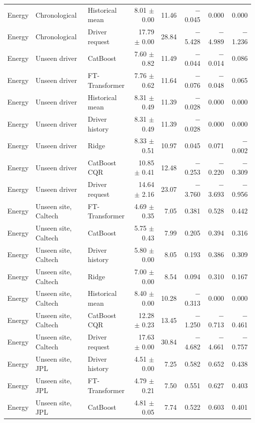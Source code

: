 {\begin{longtable}{lllrrrrr}
Energy & Chronological & Historical mean & 8.01 $\pm$ 0.00 & 11.46 & $-$0.045 & 0.000 & 0.000 \\
Energy & Chronological & Driver request & 17.79 $\pm$ 0.00 & 28.84 & $-$5.428 & $-$4.989 & $-$1.236 \\
Energy & Unseen driver & CatBoost & 7.60 $\pm$ 0.82 & 11.49 & $-$0.044 & $-$0.014 & 0.086 \\
Energy & Unseen driver & FT-Transformer & 7.76 $\pm$ 0.62 & 11.64 & $-$0.076 & $-$0.048 & 0.065 \\
Energy & Unseen driver & Historical mean & 8.31 $\pm$ 0.49 & 11.39 & $-$0.028 & 0.000 & 0.000 \\
Energy & Unseen driver & Driver history & 8.31 $\pm$ 0.49 & 11.39 & $-$0.028 & 0.000 & 0.000 \\
Energy & Unseen driver & Ridge & 8.33 $\pm$ 0.51 & 10.97 & 0.045 & 0.071 & $-$0.002 \\
Energy & Unseen driver & CatBoost CQR & 10.85 $\pm$ 0.41 & 12.48 & $-$0.253 & $-$0.220 & $-$0.309 \\
Energy & Unseen driver & Driver request & 14.64 $\pm$ 2.16 & 23.07 & $-$3.760 & $-$3.693 & $-$0.956 \\
Energy & Unseen site, Caltech & FT-Transformer & 4.69 $\pm$ 0.35 & 7.05 & 0.381 & 0.528 & 0.442 \\
Energy & Unseen site, Caltech & CatBoost & 5.75 $\pm$ 0.43 & 7.99 & 0.205 & 0.394 & 0.316 \\
Energy & Unseen site, Caltech & Driver history & 5.80 $\pm$ 0.00 & 8.05 & 0.193 & 0.386 & 0.309 \\
Energy & Unseen site, Caltech & Ridge & 7.00 $\pm$ 0.00 & 8.54 & 0.094 & 0.310 & 0.167 \\
Energy & Unseen site, Caltech & Historical mean & 8.40 $\pm$ 0.00 & 10.28 & $-$0.313 & 0.000 & 0.000 \\
Energy & Unseen site, Caltech & CatBoost CQR & 12.28 $\pm$ 0.23 & 13.45 & $-$1.250 & $-$0.713 & $-$0.461 \\
Energy & Unseen site, Caltech & Driver request & 17.63 $\pm$ 0.00 & 30.84 & $-$4.682 & $-$4.661 & $-$0.757 \\
Energy & Unseen site, JPL & Driver history & 4.51 $\pm$ 0.00 & 7.25 & 0.582 & 0.652 & 0.438 \\
Energy & Unseen site, JPL & FT-Transformer & 4.79 $\pm$ 0.21 & 7.50 & 0.551 & 0.627 & 0.403 \\
Energy & Unseen site, JPL & CatBoost & 4.81 $\pm$ 0.05 & 7.74 & 0.522 & 0.603 & 0.401 \\

\end{longtable}}
